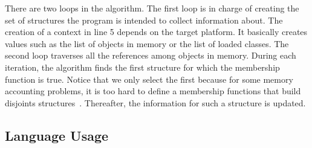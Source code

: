There are two loops in the algorithm. 
The first loop is in charge of creating the set of structures the program is intended to collect information about.
The creation of a context in line 5 depends on the target platform.
It basically creates values such as the list of objects in memory or the list of loaded classes.
The second loop traverses all the references among objects in memory.
During each iteration, the algorithm finds the first structure for which the membership function is true.
Notice that we only select the first because for some memory accounting problems, it is too hard to define a membership functions that build disjoints structures~\cite{dsn/09/geoffray/ijvm,Attouchi:2014:MMM:2602458.2602467}.
Thereafter, the information for such a structure is updated.



\subsection{Language Usage} \label{sec:dsl-usage-examples}

